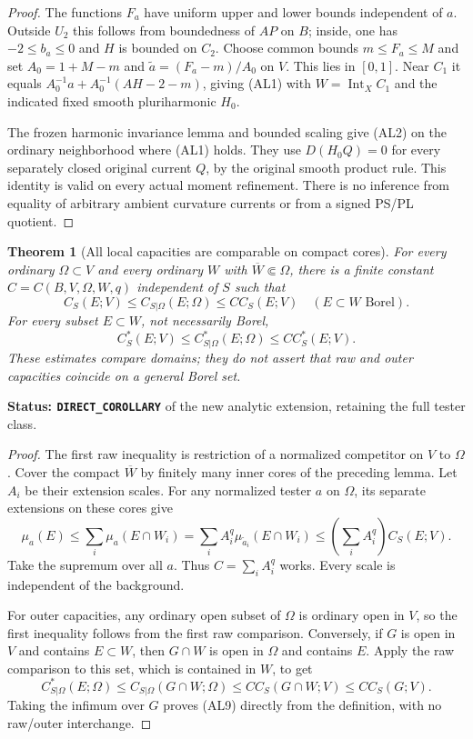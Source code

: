 \documentclass[11pt,a4paper]{article}
\numberwithin{equation}{section}
\newtheorem{theorem}{Theorem}[section]
\theoremstyle{definition}
\theoremstyle{remark}
\begin{document}
\begin{proof}
The functions $F_a$ have uniform upper and lower bounds
independent of $a$. Outside $U_2$ this follows from boundedness
of $AP$ on $B$; inside, one has $-2\leq b_a\leq0$ and
$H$ is bounded on $C_2$. Choose common bounds $m\leq F_a\leq M$
and set $A_0=1+M-m$ and
$\widetilde a=(F_a-m)/A_0$ on $V$.
This lies in $[0,1]$. Near $C_1$ it equals
$A_0^{-1}a+A_0^{-1}(AH-2-m)$, giving (AL1) with
$W=\operatorname{Int}_X C_1$ and the indicated fixed
smooth pluriharmonic $H_0$.

The frozen harmonic invariance lemma and bounded scaling
give (AL2) on the ordinary neighborhood where (AL1) holds.
They use $D(H_0Q)=0$ for every separately closed original
current $Q$, by the original smooth product rule. This
identity is valid on every actual moment refinement.
There is no inference from equality of arbitrary ambient
curvature currents or from a signed PS/PL quotient.
\end{proof}

\begin{theorem}[All local capacities are comparable on compact cores]
\label{thm:r11-affinoid-domain-capacity-comparison}
For every ordinary $\Omega\subset V$ and every ordinary
$W$ with $\overline W\Subset\Omega$, there is a finite
constant $C=C(B,V,\Omega,W,q)$ independent of $S$ such that
\[
 C_S(E;V)\leq C_{S|\Omega}(E;\Omega)
                  \leq C C_S(E;V)
                    \quad(E\subset W\text{ Borel}).
 \tag{AL8}
\]
For every subset $E\subset W$, not necessarily Borel,
\[
 C_S^*(E;V)\leq C_{S|\Omega}^*(E;\Omega)
                  \leq C C_S^*(E;V).
 \tag{AL9}
\]
These estimates compare domains; they do not assert that raw
and outer capacities coincide on a general Borel set.
\end{theorem}

\noindent\textbf{Status: \texttt{DIRECT\_COROLLARY}} of
the new analytic extension, retaining the full tester class.

\begin{proof}
The first raw inequality is restriction of a normalized
competitor on $V$ to $\Omega$. Cover the compact $\overline W$
by finitely many inner cores of the preceding lemma. Let
$A_i$ be their extension scales. For any normalized tester
$a$ on $\Omega$, its separate extensions on these cores give
\[
 \mu_a(E)\leq\sum_i\mu_a(E\cap W_i)
       =\sum_i A_i^q\mu_{\widetilde a_i}(E\cap W_i)
       \leq\left(\sum_i A_i^q\right)C_S(E;V).
\]
Take the supremum over all $a$. Thus $C=\sum_i A_i^q$
works. Every scale is independent of the background.

For outer capacities, any ordinary open subset of $\Omega$
is ordinary open in $V$, so the first inequality follows
from the first raw comparison. Conversely, if $G$ is open
in $V$ and contains $E\subset W$, then $G\cap W$ is open
in $\Omega$ and contains $E$. Apply the raw comparison to
this set, which is contained in $W$, to get
\[
 C_{S|\Omega}^*(E;\Omega)
       \leq C_{S|\Omega}(G\cap W;\Omega)
       \leq C C_S(G\cap W;V)\leq C C_S(G;V).
\]
Taking the infimum over $G$ proves (AL9) directly from the
definition, with no raw/outer interchange.
\end{proof}
\end{document}
